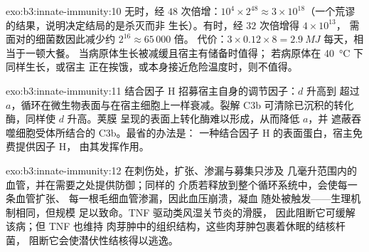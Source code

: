 \begin{solution}{exo:b3:innate-immunity:10}
无时，经 $48$ 次倍增：$10^{4}\times 2^{48} \approx 3\times
10^{18}$（一个荒谬的结果，说明决定结局的是杀灭而非
生长）。有时，经 $32$ 次倍增得 $4\times 10^{13}$，
需面对的细菌数因此减少约 $2^{16} \approx 65\,000$ 倍。
代价：$3\times 0.12\times 8 = \qty{2.9}{MJ}$ 每天，相当于一顿大餐。
当病原体生长被减缓且宿主有储备时值得；
若病原体在 \qty{40}{\celsius} 下同样生长，或宿主
正在挨饿，或本身接近危险温度时，则不值得。
\end{solution}

\begin{solution}{exo:b3:innate-immunity:11}
结合因子 H 招募宿主自身的调节因子：$d$ 升高到
超过 $a$，循环在微生物表面与在宿主细胞上一样衰减。裂解
C3b 可清除已沉积的转化酶，同样使 $d$ 升高。荚膜
呈现的表面上转化酶难以形成，从而降低 $a$，并
遮蔽吞噬细胞受体所结合的 C3b。最省的办法是：
一种结合因子 H 的表面蛋白，宿主免费提供因子 H，
由其发挥作用。
\end{solution}

\begin{solution}{exo:b3:innate-immunity:12}
在刺伤处，扩张、渗漏与募集只涉及
几毫升范围内的血管，并在需要之处提供防御；同样的
介质若释放到整个循环系统中，会使每一条血管扩张、
每一根毛细血管渗漏，因此血压崩溃，凝血
随处被触发——生理机制相同，但规模
足以致命。TNF 驱动类风湿关节炎的滑膜，
因此阻断它可缓解该病；但 TNF 也维持
肉芽肿中的组织结构，这些肉芽肿包裹着休眠的结核杆菌，
阻断它会使潜伏性结核得以逃逸。
\end{solution}

